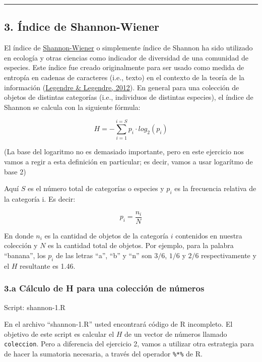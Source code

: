 \documentclass[]{article}
\begin{document}
\begin{center}\rule{3in}{0.4pt}\end{center}

\subsection{3. Índice de Shannon-Wiener}

El índice de
\href{https://es.wikipedia.org/wiki/\%C3\%8Dndice\_de\_Shannon}{Shannon-Wiener}
o simplemente índice de Shannon ha sido utilizado en ecología y otras
ciencias como indicador de diversidad de una comunidad de especies. Este
índice fue creado originalmente para ser usado como medida de entropía
en cadenas de caracteres (i.e., texto) en el contexto de la teoría de la
información (\href{http://www.amazon.com/dp/0444538682}{Legendre \&
Legendre, 2012}). En general para una colección de objetos de distintas
categorías (i.e., individuos de distintas especies), el índice de
Shannon se calcula con la siguiente fórmula:

\[
  H = - \sum_{i=1}^{i=S} p_i \cdot log_2 (p_i)
\]

(La base del logaritmo no es demasiado importante, pero en este
ejercicio nos vamos a regir a esta definición en particular; es decir,
vamos a usar logarítmo de base 2)

Aquí $S$ es el número total de categorías o especies y $p_i$ es la
frecuencia relativa de la categoría i. Es decir:

\[
  p_i = \frac{n_i}{N}
\]

En donde $n_i$ es la cantidad de objetos de la categoría $i$ contenidos
en nuestra colección y $N$ es la cantidad total de objetos. Por ejemplo,
para la palabra ``banana'', los $p_i$ de las letras ``a'', ``b'' y ``n''
son $3/6$, $1/6$ y $2/6$ respectivamente y el $H$ resultante es 1.46.

\subsubsection{3.a Cálculo de H para una colección de números}

Script: shannon-1.R

En el archivo ``shannon-1.R'' usted encontrará código de R incompleto.
El objetivo de este script es calcular el $H$ de un vector de números
llamado \texttt{coleccion}. Pero a diferencia del ejercicio 2, vamos a
utilizar otra estrategia para de hacer la sumatoria necesaria, a través
del operador \texttt{\%*\%} de R.
\end{document}
